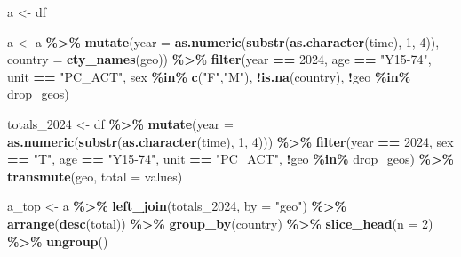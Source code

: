 \documentclass[
]{article}
\newenvironment{Shaded}{\begin{snugshade}}{\end{snugshade}}
\newcommand{\AttributeTok}[1]{\textcolor[rgb]{0.13,0.29,0.53}{#1}}
\newcommand{\DecValTok}[1]{\textcolor[rgb]{0.00,0.00,0.81}{#1}}
\newcommand{\FunctionTok}[1]{\textcolor[rgb]{0.13,0.29,0.53}{\textbf{#1}}}
\newcommand{\NormalTok}[1]{#1}
\newcommand{\OtherTok}[1]{\textcolor[rgb]{0.56,0.35,0.01}{#1}}
\newcommand{\SpecialCharTok}[1]{\textcolor[rgb]{0.81,0.36,0.00}{\textbf{#1}}}
\newcommand{\StringTok}[1]{\textcolor[rgb]{0.31,0.60,0.02}{#1}}
\begin{document}
\begin{Shaded}
\begin{Highlighting}[]
\NormalTok{a }\OtherTok{\textless{}{-}}\NormalTok{ df}

\NormalTok{a }\OtherTok{\textless{}{-}}\NormalTok{ a }\SpecialCharTok{\%\textgreater{}\%}
\FunctionTok{mutate}\NormalTok{(}\AttributeTok{year =} \FunctionTok{as.numeric}\NormalTok{(}\FunctionTok{substr}\NormalTok{(}\FunctionTok{as.character}\NormalTok{(time), }\DecValTok{1}\NormalTok{, }\DecValTok{4}\NormalTok{)),}
\AttributeTok{country =} \FunctionTok{cty\_names}\NormalTok{(geo)) }\SpecialCharTok{\%\textgreater{}\%}
\FunctionTok{filter}\NormalTok{(year }\SpecialCharTok{==} \DecValTok{2024}\NormalTok{, age }\SpecialCharTok{==} \StringTok{"Y15{-}74"}\NormalTok{, unit }\SpecialCharTok{==} \StringTok{"PC\_ACT"}\NormalTok{,}
\NormalTok{sex }\SpecialCharTok{\%in\%} \FunctionTok{c}\NormalTok{(}\StringTok{"F"}\NormalTok{,}\StringTok{"M"}\NormalTok{), }\SpecialCharTok{!}\FunctionTok{is.na}\NormalTok{(country), }\SpecialCharTok{!}\NormalTok{geo }\SpecialCharTok{\%in\%}\NormalTok{ drop\_geos)}


\NormalTok{totals\_2024 }\OtherTok{\textless{}{-}}\NormalTok{ df }\SpecialCharTok{\%\textgreater{}\%}
\FunctionTok{mutate}\NormalTok{(}\AttributeTok{year =} \FunctionTok{as.numeric}\NormalTok{(}\FunctionTok{substr}\NormalTok{(}\FunctionTok{as.character}\NormalTok{(time), }\DecValTok{1}\NormalTok{, }\DecValTok{4}\NormalTok{))) }\SpecialCharTok{\%\textgreater{}\%}
\FunctionTok{filter}\NormalTok{(year }\SpecialCharTok{==} \DecValTok{2024}\NormalTok{, sex }\SpecialCharTok{==} \StringTok{"T"}\NormalTok{, age }\SpecialCharTok{==} \StringTok{"Y15{-}74"}\NormalTok{, unit }\SpecialCharTok{==} \StringTok{"PC\_ACT"}\NormalTok{,}
\SpecialCharTok{!}\NormalTok{geo }\SpecialCharTok{\%in\%}\NormalTok{ drop\_geos) }\SpecialCharTok{\%\textgreater{}\%}
\FunctionTok{transmute}\NormalTok{(geo, }\AttributeTok{total =}\NormalTok{ values)}

\NormalTok{a\_top }\OtherTok{\textless{}{-}}\NormalTok{ a }\SpecialCharTok{\%\textgreater{}\%}
\FunctionTok{left\_join}\NormalTok{(totals\_2024, }\AttributeTok{by =} \StringTok{"geo"}\NormalTok{) }\SpecialCharTok{\%\textgreater{}\%}
\FunctionTok{arrange}\NormalTok{(}\FunctionTok{desc}\NormalTok{(total)) }\SpecialCharTok{\%\textgreater{}\%}
\FunctionTok{group\_by}\NormalTok{(country) }\SpecialCharTok{\%\textgreater{}\%} \FunctionTok{slice\_head}\NormalTok{(}\AttributeTok{n =} \DecValTok{2}\NormalTok{) }\SpecialCharTok{\%\textgreater{}\%} \FunctionTok{ungroup}\NormalTok{()}


\end{Highlighting}
\end{Shaded}
\end{document}
